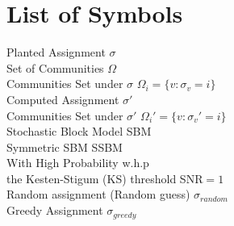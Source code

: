 \chapter*{List of Symbols}

\begin{large}
Planted Assignment \hfill $\sigma$\vspace{3mm}\\ 
Set of Communities \hfill $\Omega$\vspace{3mm}\\
Communities Set under $\sigma$ \hfill $\Omega_i=\{v: \sigma_v=i\}$\vspace{3mm}\\
Computed Assignment \hfill $\sigma'$\vspace{3mm}\\
Communities Set under $\sigma'$ \hfill $\Omega_i'=\{v: \sigma_v'=i\}$\vspace{3mm}\\
Stochastic Block Model \hfill SBM\vspace{3mm}\\
Symmetric SBM \hfill SSBM\vspace{3mm}\\
With High Probability \hfill w.h.p\vspace{3mm}\\
the Kesten-Stigum (KS) threshold \hfill SNR$=1$\vspace{3mm}\\
Random assignment (Random guess) \hfill $\sigma_{random}$\vspace{3mm}\\
Greedy Assignment \hfill $\sigma_{greedy}$\vspace{3mm}\\
\end{large}